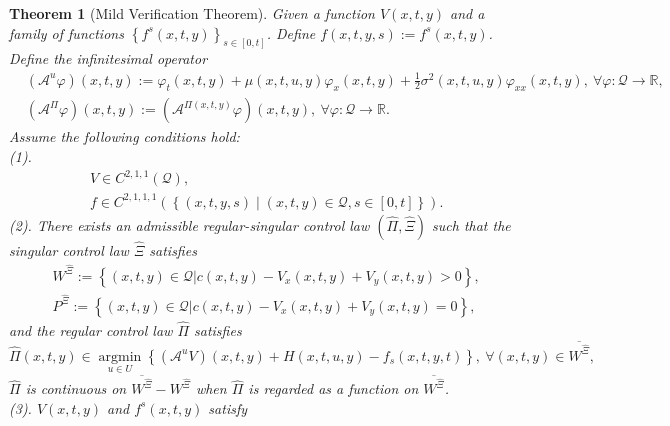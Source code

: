 \documentclass[11pt,reqno]{article}%
\newtheorem{theorem}{Theorem}[section]
\numberwithin{equation}{section}
\begin{document}
\begin{theorem}[Mild Verification Theorem]\label{mildverificationthm}
Given a function $V(x,t,y)$ and a family of functions $\left\{f^{s}(x,t,y)\right\}_{s\in[0,t]}$. Define $f(x,t,y,s):=f^{s}(x,t,y)$. Define the infinitesimal operator
\begin{equation}
\begin{aligned}
&\left(\mathcal{A}^{u}\varphi\right)(x,t,y):=\varphi_{t}(x,t,y)+\mu(x,t,u,y)\varphi_{x}(x,t,y)+\frac{1}{2}\sigma^{2}(x,t,u,y)\varphi_{xx}(x,t,y),\ \forall\varphi:\mathcal{Q}\rightarrow\mathbb{R},\\
&\left(\mathcal{A}^{\Pi}\varphi\right)(x,t,y):=\left(\mathcal{A}^{\Pi(x,t,y)}\varphi\right)(x,t,y),\ \forall\varphi:\mathcal{Q}\rightarrow\mathbb{R}.
\end{aligned}\nonumber
\end{equation} 
Assume the following conditions hold:\\
(1).
\begin{equation}
\begin{aligned}
& V \in C^{2,1,1}\left(\mathcal{Q}\right), \\
& f \in C^{2,1,1,1}\left(\left\{(x,t,y,s)\mid (x,t,y)\in\mathcal{Q}, s\in [0,t]\right\}\right).
\end{aligned}\nonumber
\end{equation}
(2). There exists an admissible regular-singular control law $\left(\hat{\Pi},\hat{\Xi}\right)$ such that the singular control law $\hat{\Xi}$ satisfies
\begin{equation}
\begin{aligned}
&W^{\hat{\Xi}}:=\left\{(x,t,y)\in\mathcal{Q}|c(x,t,y)-V_{x}(x,t,y)+V_{y}(x,t,y)>0\right\},\\
&P^{\hat{\Xi}}:=\left\{(x,t,y)\in\mathcal{Q}|c(x,t,y)-V_{x}(x,t,y)+V_{y}(x,t,y)=0\right\},
\end{aligned}\nonumber
\end{equation}
and the regular control law $\hat{\Pi}$ satisfies
\begin{equation}
\hat{\Pi}(x,t,y)\in\mathop{\mathrm{argmin}}\limits_{u\in U}\left\{\left(\mathcal{A}^{u}V\right)(x,t,y)+H(x,t,u,y)-f_s(x,t,y,t)\right\},\ \forall (x,t,y)\in \overline{W^{\hat{\Xi}}},
\label{mildpi}
\end{equation}
$\hat{\Pi}$ is continuous on $\overline{W^{\hat{\Xi}}}-W^{\hat{\Xi}}$ when $\hat{\Pi}$ is regarded as a function on $\overline{W^{\hat{\Xi}}}$. \\
(3). $V(x,t,y)$ and $f^{s}(x,t,y)$ satisfy


\end{theorem}
\end{document}
